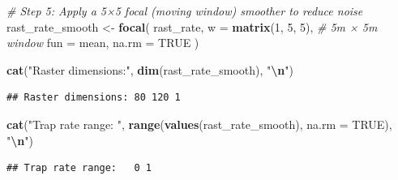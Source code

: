 \documentclass[
]{article}
\newenvironment{Shaded}{\begin{snugshade}}{\end{snugshade}}
\newcommand{\AttributeTok}[1]{\textcolor[rgb]{0.13,0.29,0.53}{#1}}
\newcommand{\CommentTok}[1]{\textcolor[rgb]{0.56,0.35,0.01}{\textit{#1}}}
\newcommand{\ConstantTok}[1]{\textcolor[rgb]{0.56,0.35,0.01}{#1}}
\newcommand{\DecValTok}[1]{\textcolor[rgb]{0.00,0.00,0.81}{#1}}
\newcommand{\FunctionTok}[1]{\textcolor[rgb]{0.13,0.29,0.53}{\textbf{#1}}}
\newcommand{\NormalTok}[1]{#1}
\newcommand{\OtherTok}[1]{\textcolor[rgb]{0.56,0.35,0.01}{#1}}
\newcommand{\SpecialCharTok}[1]{\textcolor[rgb]{0.81,0.36,0.00}{\textbf{#1}}}
\newcommand{\StringTok}[1]{\textcolor[rgb]{0.31,0.60,0.02}{#1}}
\begin{document}
\begin{Shaded}
\begin{Highlighting}[]
\CommentTok{\# Step 5: Apply a 5×5 focal (moving window) smoother to reduce noise}
\NormalTok{rast\_rate\_smooth }\OtherTok{\textless{}{-}} \FunctionTok{focal}\NormalTok{(}
\NormalTok{  rast\_rate,}
  \AttributeTok{w   =} \FunctionTok{matrix}\NormalTok{(}\DecValTok{1}\NormalTok{, }\DecValTok{5}\NormalTok{, }\DecValTok{5}\NormalTok{),   }\CommentTok{\# 5m × 5m window}
  \AttributeTok{fun =}\NormalTok{ mean,}
  \AttributeTok{na.rm =} \ConstantTok{TRUE}
\NormalTok{)}

\FunctionTok{cat}\NormalTok{(}\StringTok{"Raster dimensions:"}\NormalTok{, }\FunctionTok{dim}\NormalTok{(rast\_rate\_smooth), }\StringTok{"}\SpecialCharTok{\textbackslash{}n}\StringTok{"}\NormalTok{)}
\end{Highlighting}
\end{Shaded}

\begin{verbatim}
## Raster dimensions: 80 120 1
\end{verbatim}

\begin{Shaded}
\begin{Highlighting}[]
\FunctionTok{cat}\NormalTok{(}\StringTok{"Trap rate range:  "}\NormalTok{, }\FunctionTok{range}\NormalTok{(}\FunctionTok{values}\NormalTok{(rast\_rate\_smooth), }\AttributeTok{na.rm =} \ConstantTok{TRUE}\NormalTok{), }\StringTok{"}\SpecialCharTok{\textbackslash{}n}\StringTok{"}\NormalTok{)}
\end{Highlighting}
\end{Shaded}

\begin{verbatim}
## Trap rate range:   0 1
\end{verbatim}
\end{document}
